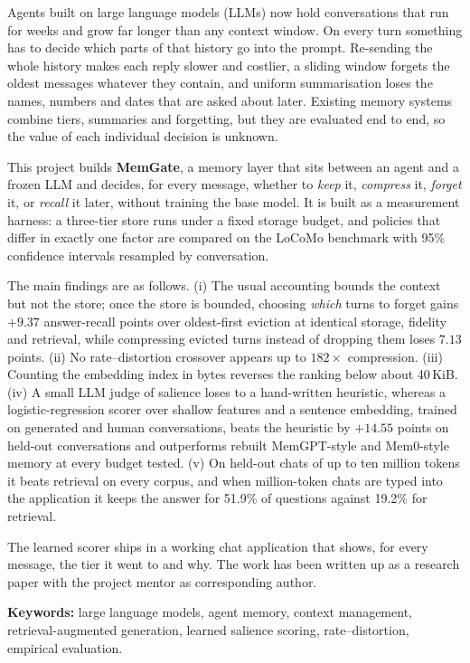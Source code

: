 Agents built on large language models (LLMs) now hold conversations that run
for weeks and grow far longer than any context window. On every turn something
has to decide which parts of that history go into the prompt. Re-sending the
whole history makes each reply slower and costlier, a sliding window forgets
the oldest messages whatever they contain, and uniform summarisation loses the
names, numbers and dates that are asked about later. Existing memory systems combine tiers, summaries and forgetting,
but they are evaluated end to end, so the value of each individual decision is
unknown.

This project builds \textbf{MemGate}, a memory layer that sits between an
agent and a frozen LLM and decides, for every message, whether to
\emph{keep} it, \emph{compress} it, \emph{forget} it, or \emph{recall} it
later, without training the base model. It is built as a measurement
harness: a three-tier store runs under a fixed storage budget, and policies
that differ in exactly one factor are compared on the LoCoMo benchmark with
95\% confidence intervals resampled by conversation.

The main findings are as follows. (i) The usual accounting bounds the
context but not the store; once the store is bounded, choosing
\emph{which} turns to forget gains $+9.37$ answer-recall points over
oldest-first eviction at identical storage, fidelity and retrieval, while
compressing evicted turns instead of dropping them loses $7.13$ points.
(ii) No rate--distortion crossover appears up to $182\times$ compression.
(iii) Counting the embedding index in bytes reverses the ranking below about
40\,KiB. (iv) A small LLM judge of salience loses to a hand-written heuristic,
whereas a logistic-regression scorer over shallow features and a sentence
embedding, trained on generated and human conversations, beats the heuristic
by $+14.55$ points on held-out conversations and outperforms rebuilt
MemGPT-style and Mem0-style memory at every budget tested. (v) On held-out
chats of up to ten million tokens it beats retrieval on every corpus, and when
million-token chats are typed into the application it keeps the answer for
51.9\% of questions against 19.2\% for retrieval.

The learned scorer ships in a working chat application that shows, for every
message, the tier it went to and why. The work has been written up as a
research paper with the project mentor as corresponding author.

\vspace{6pt}
\noindent\textbf{Keywords:} large language models, agent memory, context
management, retrieval-augmented generation, learned salience scoring,
rate--distortion, empirical evaluation.
